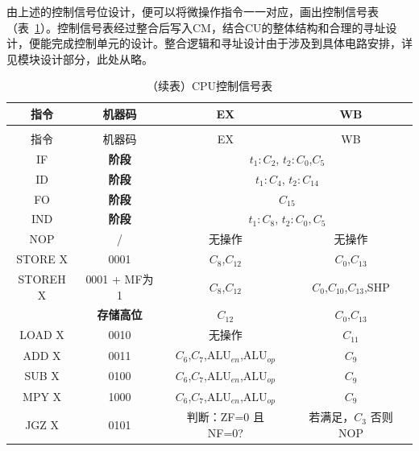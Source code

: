 \documentclass[lang=cn,a4paper,newtx]{elegantpaper}
\begin{document}
由上述的控制信号位设计，便可以将微操作指令一一对应，画出控制信号表（表~\ref{tab:five_stage_pipeline_ctrl}）。控制信号表经过整合后写入CM，结合CU的整体结构和合理的寻址设计，便能完成控制单元的设计。整合逻辑和寻址设计由于涉及到具体电路安排，详见模块设计部分，此处从略。
\begin{longtable}{cccc}
  \caption{CPU控制信号表} \label{tab:five_stage_pipeline_ctrl}\\
  \toprule
  指令 & 机器码  & EX & WB \\
  \midrule
  \endfirsthead

  \toprule
  \caption[]{（续表）CPU控制信号表} \\
  \toprule
  指令 & 机器码 & EX & WB \\
  \midrule
  \endhead

  \bottomrule
  \endlastfoot
  \rowcolor{red!10}
  IF & \textbf{阶段} & \multicolumn{2}{c}{$t_1:C_2$, $t_2:C_0$,$C_5$} \\
  \midrule
  \rowcolor{yellow!10}
  ID & \textbf{阶段} & \multicolumn{2}{c}{$t_1:C_4$,  $t_2:C_{14}$}\\
  \midrule
  \rowcolor{blue!10}
  FO & \textbf{阶段} & \multicolumn{2}{c}{$C_{15}$} \\
  \midrule
  \rowcolor{green!10}
  IND & \textbf{阶段} & \multicolumn{2}{c}{$t_1:C_8$, $t_2:C_0,C_5$}\\
  \midrule
  NOP & /  & 无操作 & 无操作 \\
  \midrule
  STORE X & 0001   & $C_8$,$C_{12}$ & $C_0$,$C_{13}$ \\

  STOREH X &  0001 + MF为1   & $C_{8}$,$C_{12}$ & $C_{0}$,$C_{10}$,$C_{13}$,SHP \\
          & \textbf{存储高位} & $C_{12}$ & $C_0$,$C_{13}$ \\

  \midrule

  LOAD X & 0010  & 
  无操作 & 
  $C_{11}$ \\
  \midrule
  ADD X & 0011 &
  
  $C_6$,$C_7$,$\text{ALU}_{en}$,$\text{ALU}_{op}$ & 
  $C_9$ \\

  SUB X & 0100 &
  $C_6$,$C_7$,$\text{ALU}_{en}$,$\text{ALU}_{op}$ & 
  $C_9$ \\
  MPY X & 1000 &
  $C_6$,$C_7$,$\text{ALU}_{en}$,$\text{ALU}_{op}$ &
  $C_9$ \\
  \midrule
  JGZ X & 0101 &
  
  判断：ZF=0 且 NF=0? & 
  \makecell{若满足，$C_3$\\否则 NOP} \\


\end{longtable}
\end{document}
